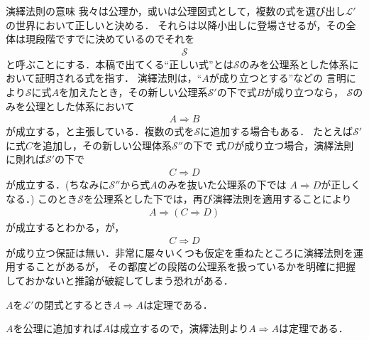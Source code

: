	
	\begin{itembox}[l]{演繹法則の意味}
		我々は公理か，或いは公理図式として，複数の式を選び出し$\mathcal{L}'$の世界において正しいと決める．
		それらは以降小出しに登場させるが，その全体は現段階ですでに決めているのでそれを
		\begin{align}
			\mathscr{S}
		\end{align}
		と呼ぶことにする．本稿で出てくる``正しい式''とは$\mathscr{S}$のみを公理系とした体系において証明される式を指す．
		演繹法則は，``$A$が成り立つとする''などの
		言明により$\mathscr{S}$に式$A$を加えたとき，その新しい公理系$\mathscr{S}'$の下で式$B$が成り立つなら，
		$\mathscr{S}$のみを公理とした体系において
		\begin{align}
			A \Longrightarrow B
		\end{align}
		が成立する，と主張している．複数の式を$\mathscr{S}$に追加する場合もある．
		たとえば$\mathscr{S}'$に式$C$を追加し，その新しい公理体系$\mathscr{S}''$の下で
		式$D$が成り立つ場合，演繹法則に則れば$\mathscr{S}'$の下で
		\begin{align}
			C \Longrightarrow D
		\end{align}
		が成立する．(ちなみに$\mathscr{S}''$から式$A$のみを抜いた公理系の下では
		$A \Longrightarrow D$が正しくなる．)
		このとき$\mathscr{S}$を公理系とした下では，再び演繹法則を適用することにより
		\begin{align}
			A \Longrightarrow (C \Longrightarrow D)
		\end{align}
		が成立するとわかる，が，
		\begin{align}
			C \Longrightarrow D
		\end{align}
		が成り立つ保証は無い．非常に屡々いくつも仮定を重ねたところに演繹法則を運用することがあるが，
		その都度どの段階の公理系を扱っているかを明確に把握しておかないと推論が破綻してしまう恐れがある．
	\end{itembox}
	
	\begin{screen}
		\begin{logicalthm}[含意の反射律]\label{logicalthm:reflective_law_of_implication}
			$A$を$\mathcal{L}'$の閉式とするとき$A \Longrightarrow A$は定理である．
		\end{logicalthm}
	\end{screen}
	
	\begin{prf}
		$A$を公理に追加すれば$A$は成立するので，演繹法則より$A \Longrightarrow A$は定理である．
		\QED
	\end{prf}
	
